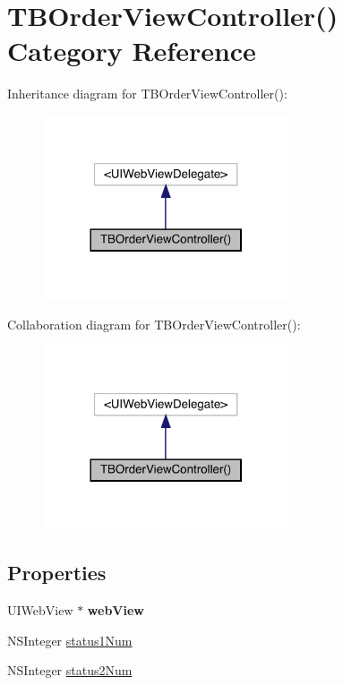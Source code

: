 \hypertarget{category_t_b_order_view_controller_07_08}{}\section{T\+B\+Order\+View\+Controller() Category Reference}
\label{category_t_b_order_view_controller_07_08}


Inheritance diagram for T\+B\+Order\+View\+Controller()\+:\nopagebreak
\begin{figure}[H]
\begin{center}
\leavevmode
\includegraphics[width=206pt]{category_t_b_order_view_controller_07_08__inherit__graph}
\end{center}
\end{figure}


Collaboration diagram for T\+B\+Order\+View\+Controller()\+:\nopagebreak
\begin{figure}[H]
\begin{center}
\leavevmode
\includegraphics[width=206pt]{category_t_b_order_view_controller_07_08__coll__graph}
\end{center}
\end{figure}
\subsection*{Properties}
\begin{DoxyCompactItemize}
\item 
\mbox{\label{category_t_b_order_view_controller_07_08_a3256241b54bf873871c6f25ec19d0f95}} 
U\+I\+Web\+View $\ast$ {\bfseries web\+View}
\item 
N\+S\+Integer \mbox{\hyperlink{category_t_b_order_view_controller_07_08_ae14bca742518267c0f84b8915ce88776}{status1\+Num}}
\item 
N\+S\+Integer \mbox{\hyperlink{category_t_b_order_view_controller_07_08_ae24c013c2bfc18fd367eb1530c2bc391}{status2\+Num}}
\end{DoxyCompactItemize}


